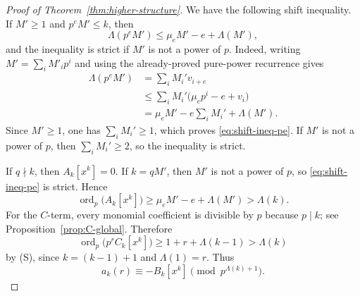 \documentclass[10pt,a4paper]{amsart}
\DeclareMathOperator{\ordop}{ord}
\newcommand{\vp}{\ordop_p}
\begin{document}
\begin{proof}[Proof of Theorem~\ref{thm:higher-structure}]
We have the following shift inequality.  If $M'\ge1$ and $p^eM'\le k$, then
\begin{equation}\label{eq:shift-ineq-pe}
        \Lambda(p^eM')\le \mu_eM'-e+\Lambda(M'),
\end{equation}
and the inequality is strict if $M'$ is not a power of $p$.  Indeed, writing $M'=\sum_i M'_ip^i$ and using the already-proved pure-power recurrence gives
\[
\begin{aligned}
        \Lambda(p^eM')
        &=\sum_i M_i'v_{i+e}\\
        &\le \sum_i M_i'\bigl(\mu_ep^i-e+v_i\bigr)\\
        &=\mu_eM'-e\sum_i M_i'+\Lambda(M').
\end{aligned}
\]
Since $M'\ge1$, one has $\sum_i M_i'\ge1$, which proves \eqref{eq:shift-ineq-pe}.  If $M'$ is not a power of $p$, then $\sum_i M_i'\ge2$, so the inequality is strict.

If $q\nmid k$, then $A_k[x^k]=0$.  If $k=qM'$, then $M'$ is not a power of $p$, so \eqref{eq:shift-ineq-pe} is strict.  Hence
\[
        \vp\bigl(A_k[x^k]\bigr)\ge \mu_eM'-e+\Lambda(M')>\Lambda(k).
\]
For the $C$-term, every monomial coefficient is divisible by $p$ because $p\mid k$; see Proposition~\ref{prop:C-global}.  Therefore
\[
        \vp\bigl(p^rC_k[x^k]\bigr)\ge 1+r+\Lambda(k-1)>\Lambda(k)
\]
by (S), since $k=(k-1)+1$ and $\Lambda(1)=r$.  Thus
\begin{equation}\label{eq:D-first-reduction-pe}
        a_k(r)\equiv -B_k[x^k]\pmod{p^{\Lambda(k)+1}}.
\end{equation}


\end{proof}
\end{document}
